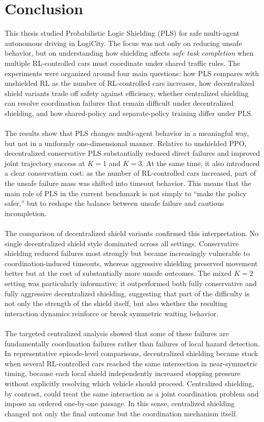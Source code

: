 \chapter{Conclusion}
\label{cha:conclusion}

This thesis studied Probabilistic Logic Shielding (PLS) for safe multi-agent autonomous driving in LogiCity. The focus was not only on reducing unsafe behavior, but on understanding how shielding affects \emph{safe task completion} when multiple RL-controlled cars must coordinate under shared traffic rules. The experiments were organized around four main questions: how PLS compares with unshielded RL as the number of RL-controlled cars increases, how decentralized shield variants trade off safety against efficiency, whether centralized shielding can resolve coordination failures that remain difficult under decentralized shielding, and how shared-policy and separate-policy training differ under PLS.
\\
\\
The results show that PLS changes multi-agent behavior in a meaningful way, but not in a uniformly one-dimensional manner. Relative to unshielded PPO, decentralized conservative PLS substantially reduced direct failures and improved joint trajectory success at \(K=1\) and \(K=3\). At the same time, it also introduced a clear conservatism cost: as the number of RL-controlled cars increased, part of the unsafe failure mass was shifted into timeout behavior. This means that the main role of PLS in the current benchmark is not simply to ``make the policy safer,'' but to reshape the balance between unsafe failure and cautious incompletion.
\\
\\
The comparison of decentralized shield variants confirmed this interpretation. No single decentralized shield style dominated across all settings. Conservative shielding reduced failures most strongly but became increasingly vulnerable to coordination-induced timeouts, whereas aggressive shielding preserved movement better but at the cost of substantially more unsafe outcomes. The mixed \(K=2\) setting was particularly informative: it outperformed both fully conservative and fully aggressive decentralized shielding, suggesting that part of the difficulty is not only the strength of the shield itself, but also whether the resulting interaction dynamics reinforce or break symmetric waiting behavior.
\\
\\
The targeted centralized analysis showed that some of these failures are fundamentally coordination failures rather than failures of local hazard detection. In representative episode-level comparisons, decentralized shielding became stuck when several RL-controlled cars reached the same intersection in near-symmetric timing, because each local shield independently increased stopping pressure without explicitly resolving which vehicle should proceed. Centralized shielding, by contrast, could treat the same interaction as a joint coordination problem and impose an ordered one-by-one passage. In this sense, centralized shielding changed not only the final outcome but the coordination mechanism itself.
